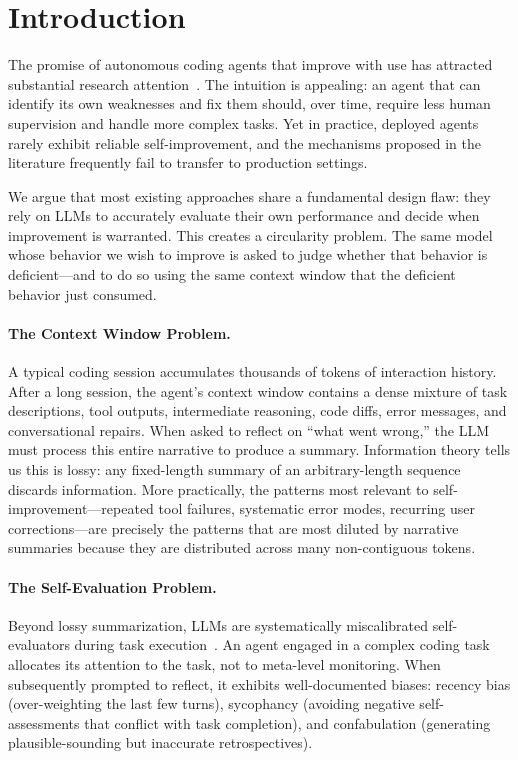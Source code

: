 \documentclass[11pt]{article}
\begin{document}
\section{Introduction}
\label{sec:intro}

The promise of autonomous coding agents that improve with use has attracted
substantial research attention~\cite{shinn2023reflexion, wang2023voyager,
wang2024openhands, wu2023autogen}. The intuition is appealing: an agent that
can identify its own weaknesses and fix them should, over time, require less
human supervision and handle more complex tasks. Yet in practice, deployed
agents rarely exhibit reliable self-improvement, and the mechanisms proposed
in the literature frequently fail to transfer to production settings.

We argue that most existing approaches share a fundamental design flaw: they
rely on LLMs to accurately evaluate their own performance and decide when
improvement is warranted. This creates a circularity problem. The same model
whose behavior we wish to improve is asked to judge whether that behavior is
deficient---and to do so using the same context window that the deficient
behavior just consumed.

\paragraph{The Context Window Problem.}
A typical coding session accumulates thousands of tokens of interaction history.
After a long session, the agent's context window contains a dense mixture of
task descriptions, tool outputs, intermediate reasoning, code diffs, error
messages, and conversational repairs. When asked to reflect on ``what went
wrong,'' the LLM must process this entire narrative to produce a summary.
Information theory tells us this is lossy: any fixed-length summary of an
arbitrary-length sequence discards information. More practically, the
patterns most relevant to self-improvement---repeated tool failures, systematic
error modes, recurring user corrections---are precisely the patterns that
are most diluted by narrative summaries because they are distributed across
many non-contiguous tokens.

\paragraph{The Self-Evaluation Problem.}
Beyond lossy summarization, LLMs are systematically miscalibrated self-evaluators
during task execution~\cite{guo2017calibration, kadavath2022language}. An agent
engaged in a complex coding task allocates its attention to the task, not to
meta-level monitoring. When subsequently prompted to reflect, it exhibits
well-documented biases: recency bias (over-weighting the last few turns),
sycophancy (avoiding negative self-assessments that conflict with task
completion), and confabulation (generating plausible-sounding but inaccurate
retrospectives).
\end{document}
